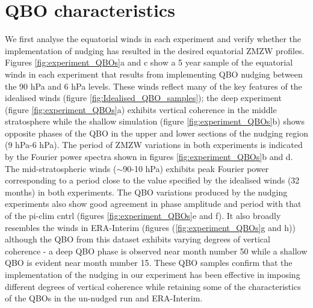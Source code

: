 \section{QBO characteristics}
We first analyse the equatorial winds in each experiment and verify whether the implementation of nudging has resulted in the desired equatorial ZMZW profiles. Figures \ref{fig:experiment_QBOs}a and c show a 5 year sample of the equatorial winds in each experiment that results from implementing QBO nudging between the 90 hPa and 6 hPa levels. These winds reflect many of the key features of the idealised winds (figure \ref{fig:Idealised_QBO_samples}); the deep experiment (figure \ref{fig:experiment_QBOs}a) exhibits vertical coherence in the middle stratosphere while the shallow simulation (figure \ref{fig:experiment_QBOs}b) shows opposite phases of the QBO in the upper and lower sections of the nudging region (9 hPa-6 hPa). The period of ZMZW variations in both experiments is indicated by the Fourier power spectra shown in figures \ref{fig:experiment_QBOs}b and d. The mid-stratospheric winds ($\sim$90-10 hPa) exhibits peak Fourier power corresponding to a period close to the value specified by the idealised winds (32 months) in both experiments. The QBO variations produced by the nudging experiments also show good agreement in phase amplitude and period with that of the pi-clim cntrl (figures \ref{fig:experiment_QBOs}e and f). It also broadly resembles the winds in ERA-Interim (figures (\ref{fig:experiment_QBOs}g and h)) although the QBO from this dataset exhibits varying degrees of vertical coherence - a deep QBO phase is observed near month number 50 while a shallow QBO is evident near month number 15. These QBO samples confirm that the implementation of the nudging in our experiment has been effective in imposing different degrees of vertical coherence while retaining some of the characteristics of the QBOs in the un-nudged run and ERA-Interim.

